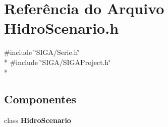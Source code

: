 \section{Referência do Arquivo Hidro\+Scenario.\+h}
\label{_hidro_scenario_8h}
{\ttfamily \#include \char`\"{}S\+I\+G\+A/\+Serie.\+h\char`\"{}}\\*
{\ttfamily \#include \char`\"{}S\+I\+G\+A/\+S\+I\+G\+A\+Project.\+h\char`\"{}}\\*
\subsection*{Componentes}
\begin{DoxyCompactItemize}
\item 
class {\bf Hidro\+Scenario}
\end{DoxyCompactItemize}
